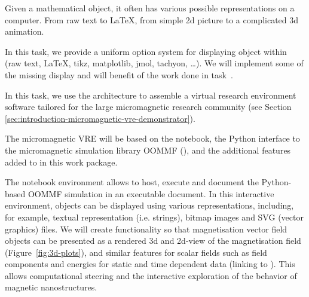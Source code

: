 \begin{workpackage}
\begin{tasklist}
\begin{task}[lead=UB,title=Common option system for various displays
  in Sage,id=Sage-display,PM=12,wphases=0-24]

  Given a mathematical object, it often has various possible
  representations on a computer. From raw text to \LaTeX, from simple
  2d picture to a complicated 3d animation.

  In this task, we provide a uniform option system for displaying
  object within \Sage (raw text, \LaTeX, tikz, matplotlib, jmol,
  tachyon, \ldots). We will implement some of the missing display and
  will benefit of the work done in task~.
\end{task}

\begin{task}[lead=USO,title=Case study: micromagnetic VRE built from
  \TheProject,id=oommf-py-ipython-attributes,PM=6,partners={SR,USH},wphases=9-15]

  In this task, we use the \TheProject architecture to assemble a
  virtual research environment software tailored for the large
  micromagnetic research community
  (see Section \ref{sec:introduction-micromagnetic-vre-demonstrator}).

  The micromagnetic VRE will be based on the \Jupyter notebook, the
  Python interface to the micromagnetic simulation library OOMMF
  (),
  and the additional features added to \Jupyter in this work
  package.

  The \Jupyter notebook environment allows to host, execute and
  document the Python-based OOMMF simulation in an executable
  document. In this interactive environment, objects can be displayed
  using various representations, including, for example, textual
  representation (i.e. strings), bitmap images and SVG (vector
  graphics) files. We will create functionality so that magnetisation
  vector field objects can be presented as a rendered 3d and 2d-view
  of the magnetisation field (Figure~\ref{fig:3d-plots}), and similar
  features for scalar fields such as field components and energies for
  static and time dependent data (linking to
  ). This allows computational steering and the
  interactive exploration of the behavior of magnetic nanostructures.


\end{task}
\end{tasklist}
\end{workpackage}
